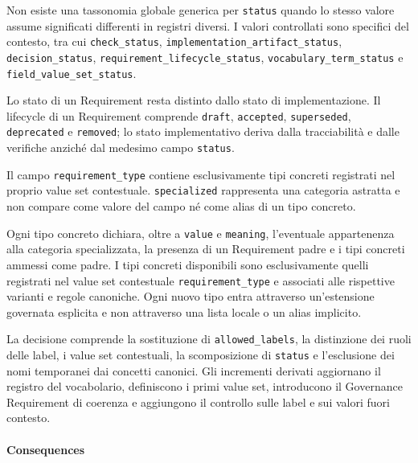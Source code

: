 \documentclass[
  10pt,
]{article}
\begin{document}
Non esiste una tassonomia globale generica per \texttt{status} quando lo
stesso valore assume significati differenti in registri diversi. I
valori controllati sono specifici del contesto, tra cui
\texttt{check\_status}, \texttt{implementation\_artifact\_status},
\texttt{decision\_status}, \texttt{requirement\_lifecycle\_status},
\texttt{vocabulary\_term\_status} e \texttt{field\_value\_set\_status}.

Lo stato di un Requirement resta distinto dallo stato di
implementazione. Il lifecycle di un Requirement comprende
\texttt{draft}, \texttt{accepted}, \texttt{superseded},
\texttt{deprecated} e \texttt{removed}; lo stato implementativo deriva
dalla tracciabilità e dalle verifiche anziché dal medesimo campo
\texttt{status}.

Il campo \texttt{requirement\_type} contiene esclusivamente tipi
concreti registrati nel proprio value set contestuale.
\texttt{specialized} rappresenta una categoria astratta e non compare
come valore del campo né come alias di un tipo concreto.

Ogni tipo concreto dichiara, oltre a \texttt{value} e \texttt{meaning},
l'eventuale appartenenza alla categoria specializzata, la presenza di un
Requirement padre e i tipi concreti ammessi come padre. I tipi concreti
disponibili sono esclusivamente quelli registrati nel value set
contestuale \texttt{requirement\_type} e associati alle rispettive
varianti e regole canoniche. Ogni nuovo tipo entra attraverso
un'estensione governata esplicita e non attraverso una lista locale o un
alias implicito.

La decisione comprende la sostituzione di \texttt{allowed\_labels}, la
distinzione dei ruoli delle label, i value set contestuali, la
scomposizione di \texttt{status} e l'esclusione dei nomi temporanei dai
concetti canonici. Gli incrementi derivati aggiornano il registro del
vocabolario, definiscono i primi value set, introducono il Governance
Requirement di coerenza e aggiungono il controllo sulle label e sui
valori fuori contesto.

\paragraph{Consequences}\label{consequences-6}
\end{document}
